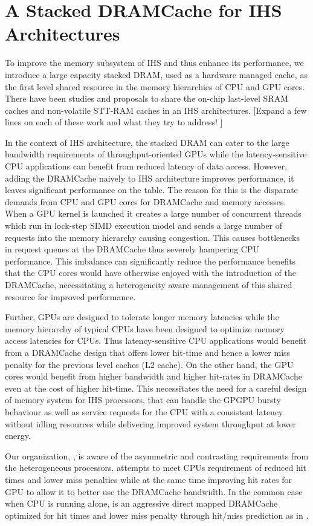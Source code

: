 \section{A Stacked DRAMCache for IHS Architectures}
To improve the memory subsystem of IHS and thus enhance its performance, we introduce a large capacity stacked DRAM, used as a hardware managed cache, as the  first level shared resource in the memory hierarchies of CPU and GPU cores. There have been studies and proposals to share the on-chip last-level SRAM caches \cite{helm,tap} and non-volatile STT-RAM caches \cite{oscar} in an IHS architectures. 
[Expand a few lines on each of these work and what they try to address! ]
\par In the context of IHS architecture, the stacked DRAM can cater to the large bandwidth requirements of throughput-oriented GPUs while the latency-sensitive CPU applications can benefit from reduced latency of data access. However, adding the DRAMCache naively to IHS architecture improves performance, it leaves significant performance on the table.  The reason for this is the  disparate demands from CPU and GPU cores for DRAMCache and memory accesses. When a GPU kernel is launched it creates a large number of concurrent threads which run in lock-step SIMD execution model and sends a large number of requests into the memory hierarchy causing congestion. This causes bottlenecks in request queues at the DRAMCache thus severely hampering CPU performance. This imbalance can significantly reduce the performance benefits that the CPU cores would have otherwise enjoyed with the introduction of the DRAMCache, necessitating a heterogeneity aware management of this shared resource for improved performance.
\par Further, GPUs are designed to tolerate longer memory latencies while the memory hierarchy of typical CPUs have been designed to optimize memory access latencies for CPUs. Thus latency-sensitive CPU applications would benefit from a DRAMCache design that offers lower hit-time and hence a lower miss penalty for the previous level caches (L2 cache). On the other hand, the GPU cores would benefit from higher bandwidth and higher hit-rates in DRAMCache even at the cost of higher hit-time.
This necessitates the need for a careful design of memory system for IHS processors, that can handle the GPGPU bursty behaviour as well as service requests for the CPU with a consistent latency without idling resources while delivering improved system throughput at lower energy.
\par Our organization, \cachename, is aware of the asymmetric and contrasting requirements from the heterogeneous processors. \cachename attempts to meet CPUs requirement of reduced hit times and lower miss penalties while at the same time improving hit rates for GPU to allow it to better use the DRAMCache bandwidth. In the common case when CPU is running alone, \cachename is an aggressive direct mapped DRAMCache optimized for hit times and lower miss penalty through hit/miss prediction as in \cite{alloy}. 

